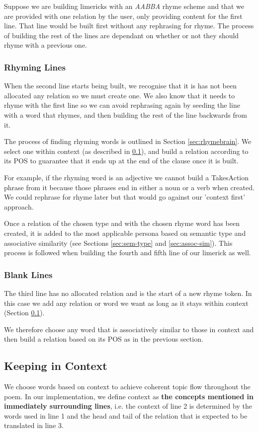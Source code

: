 Suppose we are building limericks with an \textit{AABBA} rhyme scheme and that we are provided with one relation by the user, only providing content for the first line. That line would be built first without any rephrasing for rhyme. The process of building the rest of the lines are dependant on whether or not they should rhyme with a previous one.

\subsubsection{Rhyming Lines}
When the second line starts being built, we recognise that it is has not been allocated any relation so we must create one. We also know that it needs to rhyme with the first line so we can avoid rephrasing again by seeding the line with a word that rhymes, and then building the rest of the line backwards from it.

The process of finding rhyming words is outlined in Section \ref{sec:rhymebrain}. We select one within context (as described in \ref{sec:context}), and build a relation according to its POS to guarantee that it ends up at the end of the clause once it is built.

For example, if the rhyming word is an adjective we cannot build a TakesAction phrase from it because those phrases end in either a noun or a verb when created. We could rephrase for rhyme later but that would go against our 'context first' approach.

Once a relation of the chosen type and with the chosen rhyme word has been created, it is added to the most applicable persona based on semantic type and associative similarity (see Sections \ref{sec:sem-type} and \ref{sec:assoc-sim}). This process is followed when building the fourth and fifth line of our limerick as well.

\subsubsection{Blank Lines}
The third line has no allocated relation and is the start of a new rhyme token. In this case we add any relation or word we want as long as it stays within context (Section \ref{sec:context}).

We therefore choose any word that is associatively similar to those in context and then  build a relation based on its POS as in the previous section.

\subsection{Keeping in Context}
\label{sec:context}
We choose words based on context to achieve coherent topic flow throughout the poem. In our implementation, we define context as \textbf{the concepts mentioned in immediately surrounding lines}, i.e. the context of line 2 is determined by the words used in line 1 and the head and tail of the relation that is expected to be translated in line 3. 

